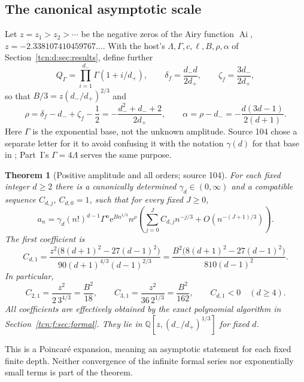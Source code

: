 \documentclass[11pt,letterpaper]{article}
\newcommand{\Ai}{\operatorname{Ai}}
\newcommand{\ee}{\mathrm e}
\newcommand{\Q}{\mathbb Q}
\newtheorem{theorem}{Theorem}[section]
\theoremstyle{remark}
\begin{document}
\subsection{The canonical asymptotic scale}
Let $z=z_1>z_2>\cdots$ be the negative zeros of the Airy function $\Ai$, $z=-2.338107410459767\ldots$. With the host's $\Lambda,\Gamma,c,\ell,B,\rho,\alpha$ of Section~\ref{tcn:d:sec:results}, define further
\begin{equation}\label{tcn:f:constants}
 Q_\Gamma=\prod_{i=1}^{d_-}\Gamma(1+i/d_+),\qquad
 \delta_f=\frac{d_-d}{2d_+},\qquad\zeta_f=\frac{3d_-}{2d_+},
\end{equation}
so that $B/3=z(d_-/d_+)^{2/3}$ and
\[
 \rho=\delta_f-d_-+\zeta_f-\frac12=-\frac{d_-^2+d_-+2}{2d_+},\qquad
 \alpha=\rho-d_-=-\frac{d(3d-1)}{2(d+1)}.
\]
Here $\Gamma$ is the exponential base, not the unknown amplitude. Source 104 chose a separate letter for it to avoid confusing it with the notation $\gamma(d)$ for that base in \cite[Theorem 1.8]{Chang2024}; Part~I's $\Gamma=4\Lambda$ serves the same purpose.

\begin{theorem}[Positive amplitude and all orders; source 104]\label{tcn:f:thm:main}
For each fixed integer $d\ge2$ there is a canonically determined $\gamma_d\in(0,\infty)$ and a compatible sequence $C_{d,j}$, $C_{d,0}=1$, such that for every fixed $J\ge0$,
\begin{equation}\label{tcn:f:allorders}
 a_n=\gamma_d(n!)^{d-1}\Gamma^n\ee^{Bn^{1/3}}n^\rho
 \left(\sum_{j=0}^J C_{d,j}n^{-j/3}+O(n^{-(J+1)/3})\right).
\end{equation}
The first coefficient is
\begin{equation}\label{tcn:f:c1}
 C_{d,1}=\frac{z^2\bigl(8(d+1)^2-27(d-1)^2\bigr)}
 {90(d+1)^{4/3}(d-1)^{2/3}}
 =\frac{B^2\bigl(8(d+1)^2-27(d-1)^2\bigr)}{810(d-1)^2}.
\end{equation}
In particular,
\[
 C_{2,1}=\frac{z^2}{2\,3^{4/3}}=\frac{B^2}{18},\qquad
 C_{3,1}=\frac{z^2}{36\,2^{1/3}}=\frac{B^2}{162},\qquad
 C_{d,1}<0\quad(d\ge4).
\]
All coefficients are effectively obtained by the exact polynomial algorithm in Section~\ref{tcn:f:sec:formal}. They lie in $\Q[z,(d_-/d_+)^{1/3}]$ for fixed $d$.
\end{theorem}
This is a Poincar\'e expansion, meaning an asymptotic statement for each fixed finite depth. Neither convergence of the infinite formal series nor exponentially small terms is part of the theorem.
\end{document}
